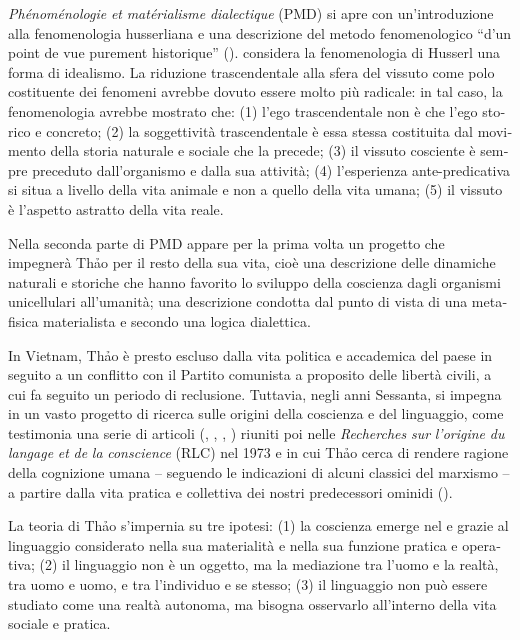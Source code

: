 \documentclass[italian,output=paper,colorlinks,citecolor=brown]{../langscibook}
\begin{document}
\begin{otherlanguage}{italian}
\textit{Phénoménologie} \textit{et} \textit{matérialisme} \textit{dialectique} (PMD) si apre con un’introduzione alla fenomenologia husserliana e una descrizione del metodo fenomenologico “d’un point de vue purement historique” (\citealt[5]{Thao1951}). \citet[7]{Thao1951} considera la fenomenologia di Husserl una forma di idealismo. La riduzione trascendentale alla sfera del vissuto come polo costituente dei fenomeni avrebbe dovuto essere molto più radicale: in tal caso, la fenomenologia avrebbe mostrato che: (1) l’ego trascendentale non è che l’ego storico e concreto; (2) la soggettività trascendentale è essa stessa costituita dal movimento della storia naturale e sociale che la precede; (3) il vissuto cosciente è sempre preceduto dall’organismo e dalla sua attività; (4) l’esperienza ante-predicativa si situa a livello della vita animale e non a quello della vita umana; (5) il vissuto è l’aspetto astratto della vita reale.

Nella seconda parte di PMD appare per la prima volta un progetto che impegnerà Th\textlatin{ả}o per il resto della sua vita, cioè una descrizione delle dinamiche naturali e storiche che hanno favorito lo sviluppo della coscienza dagli organismi unicellulari all’umanità; una descrizione condotta dal punto di vista di una metafisica materialista e secondo una logica dialettica.

In Vietnam, Thảo è presto escluso dalla vita politica e accademica del paese in seguito a un conflitto con il Partito comunista a proposito delle libertà civili, a cui fa seguito un periodo di reclusione. Tuttavia, negli anni Sessanta, si impegna in un vasto progetto di ricerca sulle origini della coscienza e del linguaggio, come testimonia una serie di articoli (\citealt{Thao1966}, \citeyear{Thao1969I}, \citeyear{Thao1969II}, \citeyear{Thao1970}) riuniti poi nelle \textit{Recherches} \textit{sur} \textit{l’origine} \textit{du} \textit{langage} \textit{et} \textit{de} \textit{la} \textit{conscience} (RLC) nel 1973 e in cui Thảo cerca di rendere ragione della cognizione umana – seguendo le indicazioni di alcuni classici del marxismo – a partire dalla vita pratica e collettiva dei nostri predecessori ominidi (\citealt{Federici1970, Caveing1974, Haudricourt1974, Frédéric1974}).

La teoria di Thảo s’impernia su tre ipotesi: (1) la coscienza emerge nel e grazie al linguaggio considerato nella sua materialità e nella sua funzione pratica e operativa; (2) il linguaggio non è un oggetto, ma la mediazione tra l’uomo e la realtà, tra uomo e uomo, e tra l’individuo e se stesso; (3) il linguaggio non può essere studiato come una realtà autonoma, ma bisogna osservarlo all’interno della vita sociale e pratica.


\end{otherlanguage}
\end{document}
